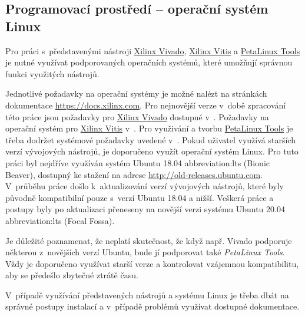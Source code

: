 \documentclass[a4paper, twoside, 11pt]{article}
\begin{document}
		\subsection{Programovací prostředí – operační systém Linux}
			Pro práci s~představenými nástroji \hyperref[subsec:xilinx-vivado]{Xilinx Vivado}, \hyperref[subsec:xilinx-vitis]{Xilinx Vitis} a \hyperref[subsec:petalinux-tools]{PetaLinux Tools} je nutné využívat podporovaných operačních systémů, které umožňují správnou funkci využitých nástrojů.\par
			Jednotlivé požadavky na operační systémy je možné nalézt na stránkách dokumentace \href{https://docs.xilinx.com}{\textcolor{ctublue}{https://docs.xilinx.com}}. Pro nejnovější verze v~době zpracování této práce jsou požadavky pro \hyperref[subsec:xilinx-vivado]{Xilinx Vivado} dostupné v~\cite{xilinx-vivado-design-suite-user-guide-2022}. Požadavky na operační systém pro \hyperref[subsec:xilinx-vitis]{Xilinx Vitis} v~\cite{vitis-unified-software-platform-documentation-2022}. Pro využivání a tvorbu \hyperref[subsec:petalinux-tools]{PetaLinux Tools} je třeba dodržet systémové požadavky uvedené v~\cite{petalinux-tools-documentation-2022}.
			Pokud uživatel využívá starších verzí vývojových nástrojů, je doporučeno využít operační systém Linux. Pro tuto práci byl nejdříve využíván systém Ubuntu 18.04 \gls{abbreviation:lts} (Bionic Beaver), dostupný ke stažení na adrese \href{http://old-releases.ubuntu.com}{\textcolor{ctublue}{http://old-releases.ubuntu.com}}. V~průběhu práce došlo k~aktualizování verzí vývojových nástrojů, které byly původně kompatibilní pouze s~verzí Ubuntu 18.04 a nižší. Veškerá práce a postupy byly po aktualizaci přeneseny na novější verzi systému Ubuntu 20.04 \gls{abbreviation:lts} (Focal Fossa).\par
			Je důležité poznamenat, že neplatí skutečnost, že když např. Vivado podporuje některou z~novějších verzí Ubuntu, bude jí podporovat také \textit{PetaLinux Tools}. Vždy je doporučeno využívat starší verze a kontrolovat vzájemnou kompatibilitu, aby se předešlo zbytečné ztrátě času.\par
			V~případě využívání představených nástrojů a systému Linux je třeba dbát na správné postupy instalací a v~případě problémů využívat dostupné dokumentace.
\end{document}
